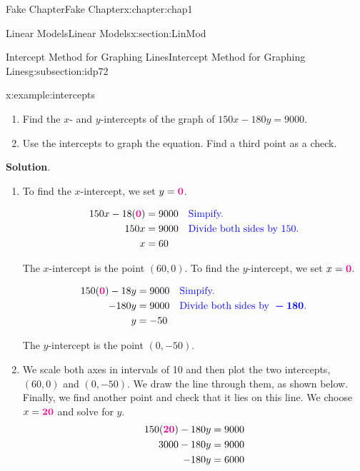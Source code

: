 \documentclass[oneside,10pt,]{book}
\newcommand{\blocktitlefont}{\relax}
\numberwithin{equation}{section}
\newcommand{\alert}[1]{\boldsymbol{\color{magenta}{#1}}}
\newcommand{\blert}[1]{\boldsymbol{\color{blue}{#1}}}
\newcommand{\amp}{&}
\begin{document}
\begin{chapterptx}{Fake Chapter}{}{Fake Chapter}{}{}{x:chapter:chap1}
\begin{sectionptx}{Linear Models}{}{Linear Models}{}{}{x:section:LinMod}
\begin{subsectionptx}{Intercept Method for Graphing Lines}{}{Intercept Method for Graphing Lines}{}{}{g:subsection:idp72}
\begin{example}{}{x:example:intercepts}%
%
\begin{enumerate}[label=\alph*]
\item{}Find the \(x\)- and \(y\)-intercepts of the graph of \(150x - 180y = 9000\).%
\item{}Use the intercepts to graph the equation. Find a third point as a check.%
\end{enumerate}
%
\par\smallskip%
\noindent\textbf{\blocktitlefont Solution}.\hypertarget{g:solution:idp73}{}\quad{}%
\begin{enumerate}[label=\alph*]
\item{}To find the \(x\)-intercept, we set \(y = \alert{0}\).%
\par
%
\begin{equation*}
\begin{aligned}[t]
150x-18(\alert{0})\amp =9000 \amp \amp \blert{\text{Simpify.}}\\
150x\amp =9000 \amp \amp \blert{\text{Divide both sides by 150.}}\\
x\amp =60   \amp \amp  
\end{aligned}
\end{equation*}
%
\par
The \(x\)-intercept is the point \((60, 0)\). To find the \(y\)-intercept, we set \(x = \alert{0}\).%
\par
%
\begin{equation*}
\begin{aligned}[t]
150(\alert{0})-18y\amp =9000 \amp \amp \blert{\text{Simpify.}}\\
-180y\amp =9000 \amp \amp \blert{\text{Divide both sides by } -180\text{.}}\\
y\amp =-50   \amp \amp  
\end{aligned}
\end{equation*}
%
\par
The \(y\)-intercept is the point \((0, -50)\).%
\item{}We scale both axes in intervals of 10 and then plot the two intercepts, \((60, 0)\) and \((0, -50)\). We draw the line through them, as shown below. Finally, we find another point and check that it lies on this line. We choose \(x = \alert{20}\) and solve for \(y\).%
\begin{align*}
150(\alert{20}) -180y \amp = 9000\\
3000 -180y \amp = 9000\\
-180y \amp = 6000\\

\end{align*}
\end{enumerate}
\end{example}
\end{subsectionptx}
\end{sectionptx}
\end{chapterptx}
\end{document}
